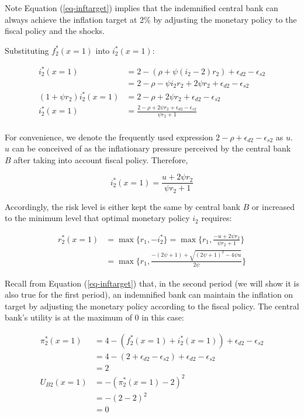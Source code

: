 \documentclass[
  a4paper,
  abstract=true]{scrartcl}
\theoremstyle{definition}
\begin{document}
Note Equation (\ref{eq-inftarget}) implies that the indemnified central
bank can always achieve the inflation target at 2\% by adjusting the
monetary policy to the fiscal policy and the shocks.

Substituting \(f_2^*(x=1)\) into \(i_2^*(x=1)\):

\begin{align*}
i^*_2(x=1) &= 2-(\rho +\psi(i_2-2)r_2)+\epsilon_{d2}-\epsilon_{s2} \\
&=2-\rho-\psi i_2r_2+2\psi r_2+\epsilon_{d2}-\epsilon_{s2} \\
(1+\psi r_2)i^*_2(x=1)&=2-\rho+2\psi r_2+\epsilon_{d2}-\epsilon_{s2} \\
i^*_2(x=1) &=\frac{2-\rho+2\psi r_2+\epsilon_{d2}-\epsilon_{s2}}{\psi r_2+1} \\
\end{align*}

For convenience, we denote the frequently used expression
\(2-\rho+\epsilon_{d2}-\epsilon_{s2}\) as \(u\). \(u\) can be conceived
of as the inflationary pressure perceived by the central bank \(B\)
after taking into account fiscal policy. Therefore,

\[
i^*_2(x=1) =\frac{u+2\psi r_2}{\psi r_2+1}
\]

Accordingly, the risk level is either kept the same by central bank
\(B\) or increased to the minimum level that optimal monetary policy
\(i_2\) requires:

\begin{align*}
r_2^*(x=1)&=\max\{r_1, -i^*_2\}=\max\{r_1,\frac{-u+2\psi r_2}{\psi r_2+1}\} \\
&=\max\{r_1,\frac{-(2\psi+1)+\sqrt{(2\psi+1)^2-4\psi u}}{2\psi}\}
\end{align*}

Recall from Equation (\ref{eq-inftarget}) that, in the second period (we
will show it is also true for the first period), an indemnified bank can
maintain the inflation on target by adjusting the monetary policy
according to the fiscal policy. The central bank's utility is at the
maximum of 0 in this case:

\begin{align*}
\pi_2^*(x=1) &= 4-(f_2^*(x=1)+i_2^*(x=1))+\epsilon_{d2}-\epsilon_{s2} \\
&=4-(2+\epsilon_{d2}-\epsilon_{s2})+\epsilon_{d2}-\epsilon_{s2} \\
&=2 \\
U_{B2}(x=1) &=-(\pi_2^*(x=1)-2)^2 \\
&=-(2-2)^2 \\
&=0
\end{align*}
\end{document}

